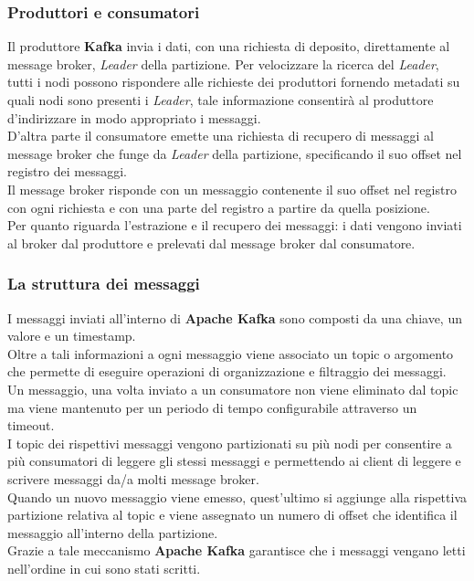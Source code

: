 \subsubsection{Produttori e consumatori}
Il produttore \textbf{Kafka} invia i dati, con una richiesta di deposito,  direttamente al \gls{message broker}{}, \textit{Leader} della partizione. Per velocizzare la ricerca del
\textit{Leader}, tutti i nodi possono rispondere alle richieste dei produttori fornendo \gls{metadati}{} su quali nodi sono presenti i \textit{Leader}, tale informazione consentirà al produttore d'indirizzare in modo
appropriato i messaggi.\\
D'altra parte il consumatore emette una richiesta di recupero di messaggi al \gls{message broker}{} che funge da \textit{Leader} della partizione, specificando il suo offset nel registro dei messaggi.\\
Il \gls{message broker}{} risponde con un messaggio contenente il suo offset nel registro con ogni richiesta e con una parte del registro a partire da quella posizione. \\
Per quanto riguarda l'estrazione e il recupero dei messaggi: i dati vengono inviati al broker dal produttore e prelevati dal \gls{message broker}{} dal consumatore. 
\subsubsection{La struttura dei messaggi}
I messaggi inviati all'interno di \textbf{Apache Kafka} sono composti da una chiave, un valore e un timestamp. \\
Oltre a tali informazioni a ogni messaggio viene associato un \gls{topic} o argomento che permette di eseguire operazioni di organizzazione 
e filtraggio dei messaggi.\\
Un messaggio, una volta inviato a un consumatore non viene eliminato dal \gls{topic}{} ma viene mantenuto per un periodo di tempo configurabile attraverso un timeout.\\
I \gls{topic}{} dei rispettivi messaggi vengono partizionati su più nodi per consentire a più consumatori di leggere gli stessi messaggi e permettendo ai client di leggere e scrivere messaggi da/a molti \gls{message broker}{}.\\
Quando un nuovo messaggio viene emesso, quest'ultimo si aggiunge alla rispettiva partizione relativa al \gls{topic}{} e viene assegnato un numero di offset che identifica il messaggio all'interno della partizione.\\
Grazie a tale meccanismo \textbf{Apache Kafka} garantisce che i messaggi vengano letti nell'ordine in cui sono stati scritti.
